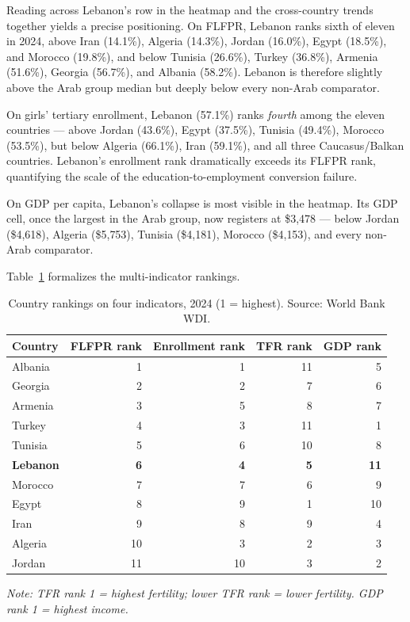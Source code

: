 \documentclass[12pt,a4paper]{article}
\begin{document}
Reading across Lebanon's row in the heatmap and the cross-country trends together yields a precise positioning. On FLFPR, Lebanon ranks sixth of eleven in 2024, above Iran (14.1\%), Algeria (14.3\%), Jordan (16.0\%), Egypt (18.5\%), and Morocco (19.8\%), and below Tunisia (26.6\%), Turkey (36.8\%), Armenia (51.6\%), Georgia (56.7\%), and Albania (58.2\%). Lebanon is therefore slightly above the Arab group median but deeply below every non-Arab comparator.

On girls' tertiary enrollment, Lebanon (57.1\%) ranks \textit{fourth} among the eleven countries --- above Jordan (43.6\%), Egypt (37.5\%), Tunisia (49.4\%), Morocco (53.5\%), but below Algeria (66.1\%), Iran (59.1\%), and all three Caucasus/Balkan countries. Lebanon's enrollment rank dramatically exceeds its FLFPR rank, quantifying the scale of the education-to-employment conversion failure.

On GDP per capita, Lebanon's collapse is most visible in the heatmap. Its GDP cell, once the largest in the Arab group, now registers at \$3{,}478 --- below Jordan (\$4{,}618), Algeria (\$5{,}753), Tunisia (\$4{,}181), Morocco (\$4{,}153), and every non-Arab comparator.

Table~\ref{tab:ranking} formalizes the multi-indicator rankings.

\begin{table}[H]
\centering
\caption{Country rankings on four indicators, 2024 (1 = highest). Source: World Bank WDI.}
\label{tab:ranking}
\begin{tabular}{lrrrr}
\toprule
\textbf{Country} & \textbf{FLFPR rank} & \textbf{Enrollment rank} & \textbf{TFR rank} & \textbf{GDP rank} \\
\midrule
Albania  & 1 &  1 & 11 &  5 \\
Georgia  & 2 &  2 &  7 &  6 \\
Armenia  & 3 &  5 &  8 &  7 \\
Turkey   & 4 &  3 & 11 &  1 \\
Tunisia  & 5 &  6 & 10 &  8 \\
\textbf{Lebanon}  & \textbf{6} &  \textbf{4} &  \textbf{5} & \textbf{11} \\
Morocco  & 7 &  7 &  6 &  9 \\
Egypt    & 8 &  9 &  1 & 10 \\
Iran     & 9 &  8 &  9 &  4 \\
Algeria  & 10 & 3 &  2 &  3 \\
Jordan   & 11 & 10 &  3 &  2 \\
\bottomrule
\end{tabular}
\small\textit{Note: TFR rank 1 = highest fertility; lower TFR rank = lower fertility. GDP rank 1 = highest income.}
\end{table}
\end{document}

